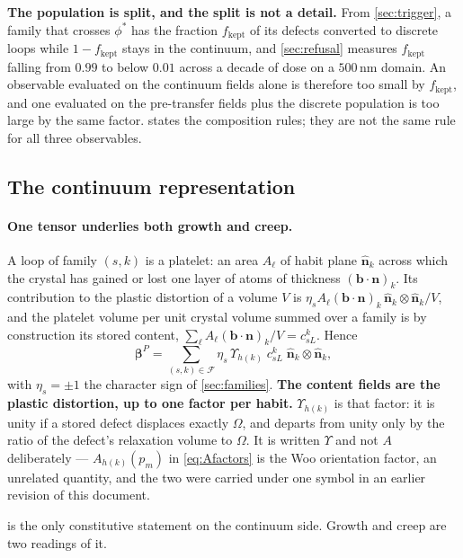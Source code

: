 \documentclass{article}
\newcommand{\bvec}{\bm b}
\newcommand{\nvec}{\bm n}
\begin{document}
\textbf{The population is split, and the split is not a detail.} From
\cref{sec:trigger}, a family that crosses $\phi^\ast$ has the fraction
$f_{\mathrm{kept}}$ of its defects converted to discrete loops while
$1-f_{\mathrm{kept}}$ stays in the continuum, and \cref{sec:refusal} measures $f_{\mathrm{kept}}$
falling from $0.99$ to below $0.01$ across a decade of dose on a $500\,$nm domain.
An observable evaluated on the continuum fields alone is therefore too small by
$f_{\mathrm{kept}}$, and one evaluated on the pre-transfer fields plus the discrete
population is too large by the same factor.  states the
composition rules; they are not the same rule for all three observables.

\subsection{The continuum representation}
\label{sec:obs-continuum}

\paragraph{One tensor underlies both growth and creep.} A loop of family $(s,k)$
is a platelet: an area $A_\ell$ of habit plane $\hat{\bm n}_k$ across which the
crystal has gained or lost one layer of atoms of thickness
$(\bvec\!\cdot\!\nvec)_k$. Its contribution to the plastic distortion of a volume
$V$ is $\eta_s A_\ell(\bvec\!\cdot\!\nvec)_k\,\hat{\bm n}_k\!\otimes\!\hat{\bm
n}_k/V$, and the platelet volume per unit crystal volume summed over a family is
by construction its stored content, $\sum_\ell A_\ell(\bvec\!\cdot\!\nvec)_k/V
=c^k_{sL}$. Hence
\begin{equation}
  \bm\beta^{P}=\sum_{(s,k)\in\mathcal F}\eta_s\,\Upsilon_{h(k)}\;c^k_{sL}\;
    \hat{\bm n}_k\!\otimes\!\hat{\bm n}_k ,
  \label{eq:betaP}
\end{equation}
with $\eta_s=\pm1$ the character sign of \cref{sec:families}. \textbf{The content
fields are the plastic distortion, up to one factor per habit.} $\Upsilon_{h(k)}$
is that factor: it is unity if a stored defect displaces exactly $\Omega$, and
departs from unity only by the ratio of the defect's relaxation volume to
$\Omega$. It is written $\Upsilon$ and not $A$ deliberately --- $A_{h(k)}(p_m)$ in
\cref{eq:Afactors} is the Woo orientation factor, an unrelated quantity, and the
two were carried under one symbol in an earlier revision of this document.

 is the only constitutive statement on the continuum side. Growth
and creep are two readings of it.
\end{document}
